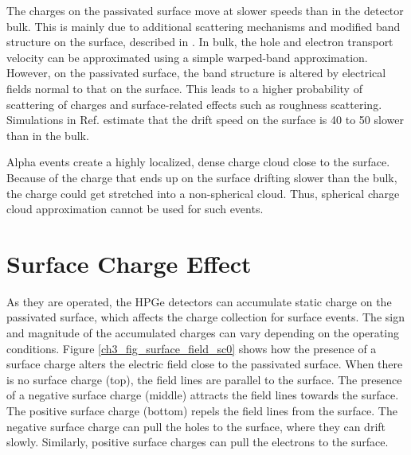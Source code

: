 The charges on the passivated surface move at slower speeds than in the detector bulk. This is mainly due to additional scattering mechanisms and modified band structure on the surface, described in \cite{MULLOWNEY201233}. In bulk, the hole and electron transport velocity can be approximated using a simple warped-band approximation. However, on the passivated surface, the band structure is altered by electrical fields normal to that on the surface. This leads to a higher probability of scattering of charges and surface-related effects such as roughness scattering.  Simulations in Ref. \cite{MULLOWNEY201233} estimate that the drift speed on the surface is 40 to 50 slower than in the bulk. 

Alpha events create a highly localized, dense charge cloud close to the surface. Because of the charge that ends up on the surface drifting slower than the bulk, the charge could get stretched into a non-spherical cloud. Thus, spherical charge cloud approximation cannot be used for such events.



\section{Surface Charge Effect}
As they are operated, the HPGe detectors can accumulate static charge on the passivated surface, which affects the charge collection for surface events. The sign and magnitude of the accumulated charges can vary depending on the operating conditions. Figure \ref{ch3_fig_surface_field_sc0} shows how the presence of a surface charge alters the electric field close to the passivated surface. When there is no surface charge (top), the field lines are parallel to the surface. The presence of a negative surface charge (middle) attracts the field lines towards the surface. The positive surface charge (bottom) repels the field lines from the surface. The negative surface charge can pull the holes to the surface, where they can drift slowly. Similarly, positive surface charges can pull the electrons to the surface.

